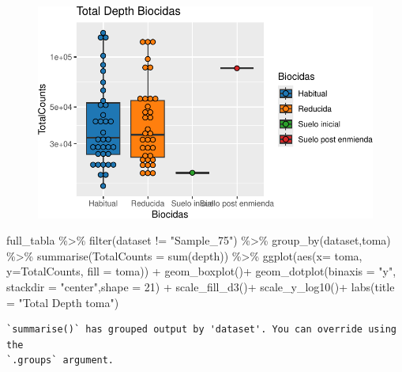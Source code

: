 \documentclass[
  letterpaper,
  DIV=11,
  numbers=noendperiod]{scrartcl}
\newenvironment{Shaded}{\begin{snugshade}}{\end{snugshade}}
\newcommand{\AttributeTok}[1]{\textcolor[rgb]{0.40,0.45,0.13}{#1}}
\newcommand{\DecValTok}[1]{\textcolor[rgb]{0.68,0.00,0.00}{#1}}
\newcommand{\FunctionTok}[1]{\textcolor[rgb]{0.28,0.35,0.67}{#1}}
\newcommand{\NormalTok}[1]{\textcolor[rgb]{0.00,0.23,0.31}{#1}}
\newcommand{\SpecialCharTok}[1]{\textcolor[rgb]{0.37,0.37,0.37}{#1}}
\newcommand{\StringTok}[1]{\textcolor[rgb]{0.13,0.47,0.30}{#1}}
\begin{document}
\begin{figure}[H]

{\centering \includegraphics{InformeNeiker_files/figure-pdf/unnamed-chunk-5-4.pdf}

}

\end{figure}

\begin{Shaded}
\begin{Highlighting}[]
\NormalTok{full\_tabla }\SpecialCharTok{\%\textgreater{}\%} \FunctionTok{filter}\NormalTok{(dataset }\SpecialCharTok{!=} \StringTok{"Sample\_75"}\NormalTok{) }\SpecialCharTok{\%\textgreater{}\%} 
  \FunctionTok{group\_by}\NormalTok{(dataset,toma) }\SpecialCharTok{\%\textgreater{}\%} 
  \FunctionTok{summarise}\NormalTok{(}\AttributeTok{TotalCounts =} \FunctionTok{sum}\NormalTok{(depth)) }\SpecialCharTok{\%\textgreater{}\%} 
  \FunctionTok{ggplot}\NormalTok{(}\FunctionTok{aes}\NormalTok{(}\AttributeTok{x=}\NormalTok{ toma, }\AttributeTok{y=}\NormalTok{TotalCounts, }\AttributeTok{fill =}\NormalTok{ toma)) }\SpecialCharTok{+} 
  \FunctionTok{geom\_boxplot}\NormalTok{()}\SpecialCharTok{+}
  \FunctionTok{geom\_dotplot}\NormalTok{(}\AttributeTok{binaxis =} \StringTok{"y"}\NormalTok{, }\AttributeTok{stackdir =} \StringTok{"center"}\NormalTok{,}\AttributeTok{shape =} \DecValTok{21}\NormalTok{) }\SpecialCharTok{+}
  \FunctionTok{scale\_fill\_d3}\NormalTok{()}\SpecialCharTok{+}
  \FunctionTok{scale\_y\_log10}\NormalTok{()}\SpecialCharTok{+}
  \FunctionTok{labs}\NormalTok{(}\AttributeTok{title =} \StringTok{"Total Depth toma"}\NormalTok{)}
\end{Highlighting}
\end{Shaded}

\begin{verbatim}
`summarise()` has grouped output by 'dataset'. You can override using the
`.groups` argument.
\end{verbatim}
\end{document}
